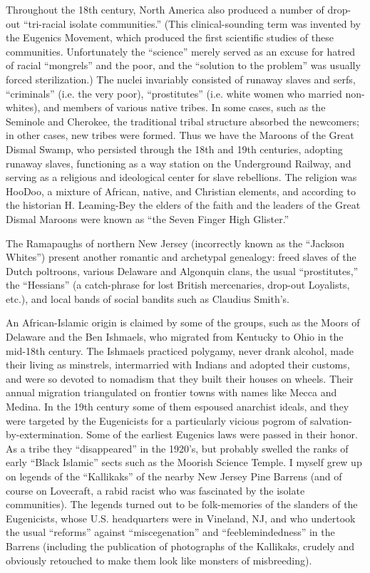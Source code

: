 \documentclass[a4paper,english,10pt,twoside]{article}
\begin{document}
\medskip
Throughout the 18th century, North America also produced a number of drop-out \enquote{tri-racial isolate communities.} (This clinical-sounding term was invented by the Eugenics Movement, which produced the first scientific studies of these communities. Unfortunately the \enquote{science} merely served as an excuse for hatred of racial \enquote{mongrels} and the poor, and the \enquote{solution to the problem} was usually forced sterilization.) The nuclei invariably consisted of runaway slaves and serfs, \enquote{criminals} (i.e. the very poor), \enquote{prostitutes} (i.e. white women who married non-whites), and members of various native tribes. In some cases, such as the Seminole and Cherokee, the traditional tribal structure absorbed the newcomers; in other cases, new tribes were formed. Thus we have the Maroons of the Great Dismal Swamp, who persisted through the 18th and 19th centuries, adopting runaway slaves, functioning as a way station on the Underground Railway, and serving as a religious and ideological center for slave rebellions. The religion was HooDoo, a mixture of African, native, and Christian elements, and according to the historian H. Leaming-Bey the elders of the faith and the leaders of the Great Dismal Maroons were known as \enquote{the Seven Finger High Glister.}

\medskip
The Ramapaughs of northern New Jersey (incorrectly known as the \enquote{Jackson Whites}) present another romantic and archetypal genealogy: freed slaves of the Dutch poltroons, various Delaware and Algonquin clans, the usual \enquote{prostitutes,} the \enquote{Hessians} (a catch-phrase for lost British mercenaries, drop-out Loyalists, etc.), and local bands of social bandits such as Claudius Smith's.

\medskip
An African-Islamic origin is claimed by some of the groups, such as the Moors of Delaware and the Ben Ishmaels, who migrated from Kentucky to Ohio in the mid-18th century. The Ishmaels practiced polygamy, never drank alcohol, made their living as minstrels, intermarried with Indians and adopted their customs, and were so devoted to nomadism that they built their houses on wheels. Their annual migration triangulated on frontier towns with names like Mecca and Medina. In the 19th century some of them espoused anarchist ideals, and they were targeted by the Eugenicists for a particularly vicious pogrom of salvation-by-extermination. Some of the earliest Eugenics laws were passed in their honor. As a tribe they \enquote{disappeared} in the 1920's, but probably swelled the ranks of early \enquote{Black Islamic} sects such as the Moorish Science Temple. I myself grew up on legends of the \enquote{Kallikaks} of the nearby New Jersey Pine Barrens (and of course on Lovecraft, a rabid racist who was fascinated by the isolate communities). The legends turned out to be folk-memories of the slanders of the Eugenicists, whose U.S. headquarters were in Vineland, NJ, and who undertook the usual \enquote{reforms} against \enquote{miscegenation} and \enquote{feeblemindedness} in the Barrens (including the publication of photographs of the Kallikaks, crudely and obviously retouched to make them look like monsters of misbreeding).
\end{document}
